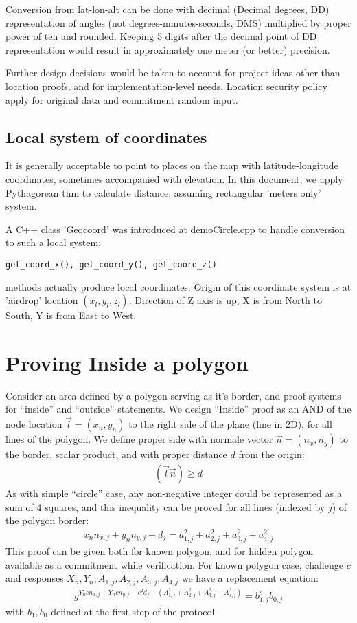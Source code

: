 \documentclass[a4paper,12pt]{article}
\begin{document}
Conversion from lat-lon-alt
can be done with decimal (Decimal degrees, DD) representation of angles (not degrees-minutes-seconds, DMS)
multiplied by proper power of ten and rounded.
Keeping 5 digits after the decimal point of DD representation would result in
approximately one meter (or better) precision.

Further design decisions would be taken
to account for project ideas other than location proofs,
and for implementation-level needs.
Location security policy apply for original data and commitment random input.

\subsection{Local system of coordinates}

It is generally acceptable to point to places on the map with latitude-longitude coordinates, sometimes accompanied with elevation.
In this document, we apply Pythagorean thm to calculate distance, assuming rectangular 'meters only' system.

A C++ class 'Geocoord' was introduced at demoCircle.cpp to handle conversion to such a local system;
\begin{verbatim}get_coord_x(), get_coord_y(), get_coord_z()\end{verbatim} methods actually produce local coordinates.
Origin of this coordinate system is at 'airdrop' location $(x_l, y_l, z_l)$.
Direction of Z axis is up, X is from North to South, Y is from East to West.

\section{Proving Inside a polygon}

Consider an area defined by a polygon serving as it's border,
and proof systems for ``inside'' and ``outside'' statements.
We design ``Inside'' proof as an AND of the node location $\vec l = (x_n, y_n)$ to the right side of the plane (line in 2D),
for all lines of the polygon.
We define proper side with normale vector $\vec n = (n_x, n_y)$ to the border, scalar product, and with proper distance $d$ from the origin:
\begin{gather}
  (\vec l \vec n) \ge d
\end{gather}
As with simple ``circle'' case, any non-negative integer could be represented as a sum of 4 squares,
and this inequality can be proved for all lines (indexed by $j$) of the polygon border:
\begin{gather}
  x_n n_{x,j} + y_n n_{y,j} - d_j = a_{1,j}^2 + a_{2,j}^2 + a_{3,j}^2 + a_{4,j}^2
\end{gather}
This proof can be given both for known polygon, and for hidden polygon available as a commitment while verification.
For known polygon case, challenge $c$ and responses $X_n, Y_n, A_{1,j}, A_{2,j}, A_{3,j}, A_{4,j}$
we have a replacement equation:
\begin{gather}
  g^{Y_n c n_{x,j} + Y_n c n_{y,j} - c^2 d_j - (A_{1,j}^2 + A_{2,j}^2 + A_{3,j}^2 + A_{4,j}^2)} = b_{1,j}^c b_{0,j}
\end{gather}
with $b_1, b_0$ defined at the first step of the protocol.
\end{document}
